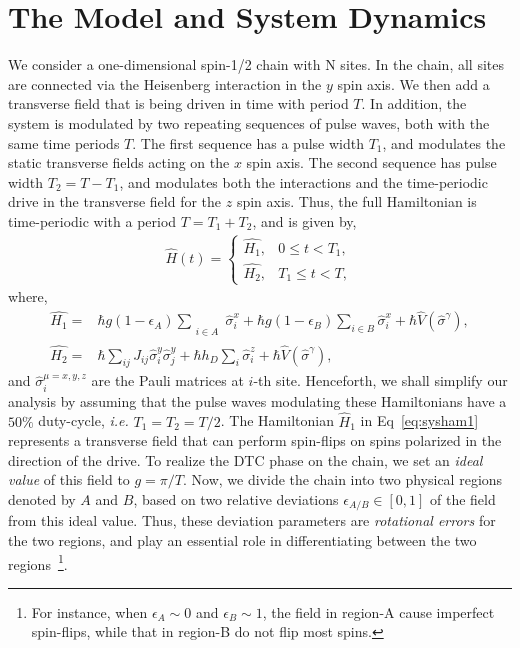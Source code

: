 \documentclass[%
nofootinbib,
reprint,
superscriptaddress,
amsmath,amssymb,showkeys,
aps,
prb,
]{revtex4-2}
\begin{document}
	\section{\label{sec:mdl_n_dynam} The Model and System Dynamics}
	We consider a one-dimensional spin-1/2 chain with N sites. In the chain, all sites are connected via the Heisenberg interaction in the $y$ spin axis. We then add a transverse field that is being driven in time with period $T$. In addition, the system is modulated by two repeating sequences of pulse waves, both with the same time periods $T$.  The first sequence has a pulse width $T_1$, and modulates the static transverse fields acting on the $x$ spin axis. The second  sequence has pulse width $T_2=T-T_1$, and modulates  both the interactions and the time-periodic drive in the transverse field for the $z$ spin axis. Thus, the full Hamiltonian is time-periodic with a period $T=T_1+T_2$, and is given by,
	\begin{align}
		\hat{H}(t) = 
		\begin{cases}
			\hat{H_1} , & 0\leq t < T_1,\\
			\hat{H_2} , & T_1\leq t < T,
		\end{cases}
		\label{eq:cleanham}
	\end{align}
	where,
	\begin{align}
		\hat{H_1} = & \hbar g (1-\epsilon_A) \sum_{\substack{\\i \in A}}\hat{\sigma}^x_i + \hbar g (1-\epsilon_B) \sum_{i \in B}\hat{\sigma}^x_i+ \hbar\hat{V}(\hat{\sigma}^{\gamma}),\label{eq:sysham1}\\
		\hat{H_2} = & \hbar\sum_{ij} J_{ij} \hat{\sigma}^y_i \hat{\sigma}^y_{j} +  \hbar h_D \sum_i \hat{\sigma}^z_i + \hbar\hat{V}(\hat{\sigma}^{\gamma}),
		\label{eq:sysham2}
	\end{align}
	and $\hat{\sigma}^{\mu=x,y,z}_i$ are the Pauli matrices at $i$-th site.  Henceforth, we shall simplify our analysis by assuming that the pulse waves modulating these Hamiltonians have a $50 \%$ duty-cycle, \textit{i.e.} $T_1=T_2=T/2$.  The Hamiltonian $\hat{H}_1$ in Eq~\ref{eq:sysham1} represents a transverse field that can perform spin-flips on spins polarized in the direction of the drive. To realize the DTC phase on the chain, we set an \textit{ideal value} of this field to $g=\pi/T$. Now, we divide the chain into two physical regions denoted by $A$ and $B$, based on two relative deviations $\epsilon_{A/B}\in[0,1]$ of the field from this ideal value. Thus, these deviation parameters are \textit{rotational errors} for the two regions, and play an essential role in differentiating between the two regions~\footnote{For instance, when $\epsilon_A \sim 0$ and $\epsilon_B \sim 1$, the field in region-A cause imperfect spin-flips, while that in region-B do not flip most spins.}. 
\end{document}

